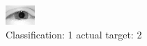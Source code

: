 \begin{figure}[h!]
\begin{center}
\includegraphics[width=0.60\columnwidth]{figures/ID2290_class_1_target_2.png}
\end{center}
\caption{ Classification: 1 actual target: 2}
\label{fig:ID2290_class_1_target_2}
\end{figure}
